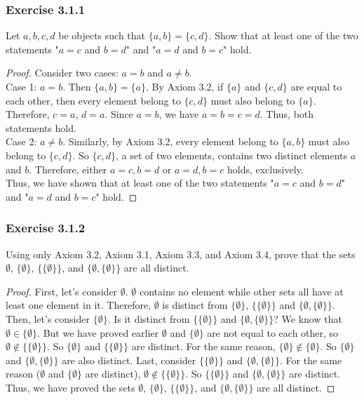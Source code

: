 \documentclass[12pt, letter]{article}
\begin{document}
\subsubsection*{Exercise 3.1.1}
Let $a,b,c,d$ be objects such that $\{a,b\}=\{c,d\}$. Show that at least one of the two statements "$a=c$ and $b=d$" and "$a=d$ and $b=c$" hold.
\begin{proof}
    Consider two cases: $a=b$ and $a\ne b$.\\
    Case 1: $a=b$. Then $\{a,b\}=\{a\}$. By Axiom 3.2, if $\{a\}$ and $\{c,d\}$ are equal to each other, then every element belong to $\{c,d\}$ must also belong to $\{a\}$. 
    Therefore, $c=a$, $d=a$. Since $a=b$, we have $a=b=c=d$. Thus, both statements hold.\\
    Case 2: $a\ne b$. Similarly, by Axiom 3.2, every element belong to $\{a,b\}$ must also belong to $\{c,d\}$. So $\{c,d\}$, a set of two elements, contains two distinct elements $a$ and $b$. Therefore, 
    either $a=c, b=d$ or $a=d, b=c$ holds, exclusively.\\
    Thus, we have shown that at least one of the two statements "$a=c$ and $b=d$" and "$a=d$ and $b=c$" hold.
\end{proof}
\subsubsection*{Exercise 3.1.2}
Using only Axiom 3.2, Axiom 3.1, Axiom 3.3, and Axiom 3.4, prove that the sets $\emptyset$, $\{\emptyset\}$, $\{\{\emptyset\}\}$, and $\{\emptyset,\{\emptyset\}\}$ are all distinct.
\begin{proof}
    First, let's consider $\emptyset$. $\emptyset$ contains no element while other sets all have at least one element in it. Therefore, $\emptyset$ is distinct from $\{\emptyset\}$, $\{\{\emptyset\}\}$ and $\{\emptyset,\{\emptyset\}\}$. 
    Then, let's consider $\{\emptyset\}$. Is it distinct from $\{\{\emptyset\}\}$ and $\{\emptyset,\{\emptyset\}\}$?
    We know that $\emptyset\in\{\emptyset\}$. But we have proved earlier $\emptyset$ and $\{\emptyset\}$ are not equal to each other, so $\emptyset\notin \{\{\emptyset\}\}$. So $\{\emptyset\}$ and $\{\{\emptyset\}\}$ are distinct. For the same reason, 
    $\{\emptyset\}\notin \{\emptyset\}$. So $\{\emptyset\}$ and $\{\emptyset,\{\emptyset\}\}$ are also distinct. Last, consider $\{\{\emptyset\}\}$ and $\{\emptyset,\{\emptyset\}\}$. For the same reason ($\emptyset$ and $\{\emptyset\}$ are distinct), 
    $\emptyset\notin \{\{\emptyset\}\}$. So $\{\{\emptyset\}\}$ and $\{\emptyset,\{\emptyset\}\}$ are distinct. Thus, we have proved the sets $\emptyset$, $\{\emptyset\}$, $\{\{\emptyset\}\}$, and $\{\emptyset,\{\emptyset\}\}$ are all distinct.
\end{proof}
\end{document}
